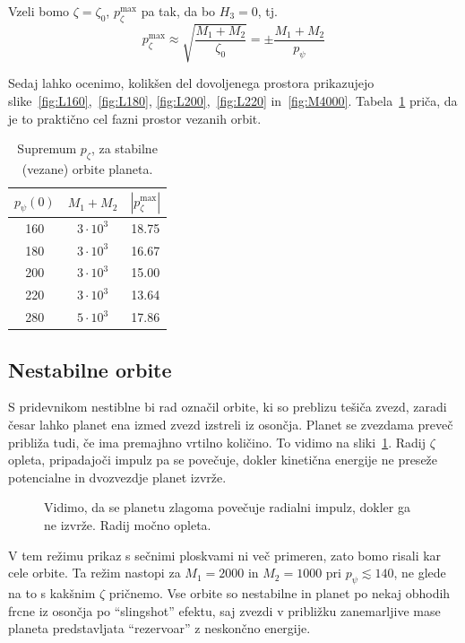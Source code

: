 \documentclass[12pt, a4paper]{article}
\begin{document}
Vzeli bomo $\zeta = \zeta_0$, $p_\zeta^\text{max}$ pa tak, da bo $H_3 = 0$, tj.
\begin{equation}
	p_\zeta^\text{max} \approx \sqrt{\frac{M_1 + M_2}{\zeta_0}} = \pm \frac{M_1 + M_2}{p_\psi}
\end{equation}

Sedaj lahko ocenimo, kolik\v sen del dovoljenega prostora prikazujejo slike~\ref{fig:L160},~\ref{fig:L180},
\ref{fig:L200},~\ref{fig:L220} in~\ref{fig:M4000}. Tabela~\ref{tab2} pri\v ca, da je to prakti\v cno cel
fazni prostor vezanih orbit.
\begin{table}[H]\centering
	\caption{Supremum $p_\zeta$, za stabilne (vezane) orbite planeta.}
	\begin{tabular}{c|c|c}
		$p_\psi(0)$ & $M_1 + M_2$ & $|p_\zeta^\text{max}|$ \\
		\hline
		160 & $3\cdot 10^3$ & 18.75 \\
		180 & $3\cdot 10^3$ & 16.67 \\
		200 & $3\cdot 10^3$ & 15.00 \\
		220 & $3\cdot 10^3$ & 13.64 \\
		280 & $5\cdot 10^3$ & 17.86
	\end{tabular}
	\label{tab2}
\end{table}

\subsection{Nestabilne orbite}

S pridevnikom nestiblne bi rad ozna\v cil orbite, ki so preblizu te\v si\v ca zvezd, zaradi \v cesar
lahko planet ena izmed zvezd izstreli iz oson\v cja. Planet se zvezdama preve\v c pribli\v za tudi, \v ce
ima premajhno vrtilno koli\v cino. To vidimo na sliki~\ref{fig:fail}. Radij $\zeta$ opleta, pripadajo\v ci
impulz pa se pove\v cuje, dokler kineti\v cna energije ne prese\v ze potencialne in dvozvezdje planet izvr\v ze.

\begin{figure}[H]\centering
	
	\caption{Vidimo, da se planetu zlagoma pove\v cuje radialni impulz, dokler ga ne izvr\v ze. Radij
		mo\v cno opleta.}
	\label{fig:fail}
\end{figure}

V tem re\v zimu prikaz s se\v cnimi ploskvami ni ve\v c primeren, zato bomo risali kar cele orbite. Ta
re\v zim nastopi za $M_1 = 2000$ in $M_2 = 1000$ pri $p_\psi \lesssim 140$, ne glede na to s kak\v snim
$\zeta$ pri\v cnemo. Vse orbite so nestabilne in planet po nekaj obhodih frcne iz oson\v cja po
"`slingshot"' efektu, saj zvezdi v pribli\v zku zanemarljive mase planeta predstavljata "`rezervoar"'
z neskon\v cno energije.
\end{document}

